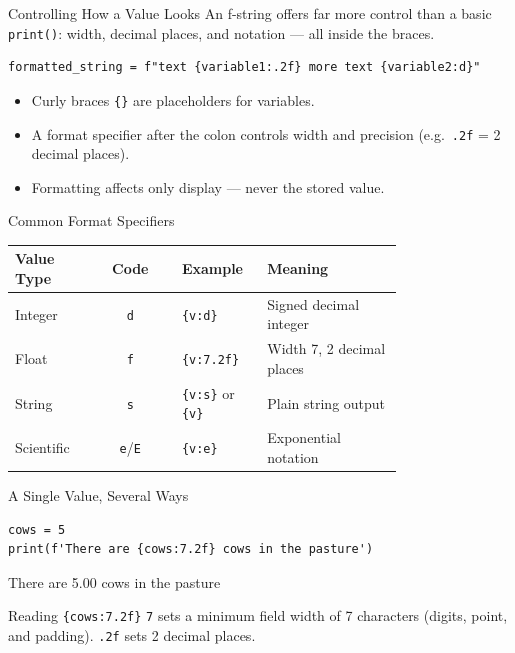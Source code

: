 \documentclass[9pt,aspectratio=169,xcolor=table]{beamer}
\newcommand{\striped}{\rowcolors{1}{white}{stripe}}
\begin{document}
\begin{frame}[fragile]{Controlling How a Value Looks}
    \leavevmode
    An f-string offers far more control than a basic \texttt{print()}:
    width, decimal places, and notation --- all inside the braces.

\begin{lstlisting}
formatted_string = f"text {variable1:.2f} more text {variable2:d}"
\end{lstlisting}

    \vspace{2mm}
    \begin{itemize}
        \item Curly braces \texttt{\{\}} are placeholders for variables.
        \item A \alert{format specifier} after the colon controls
              width and precision (e.g.\ \texttt{.2f} = 2 decimal
              places).
        \item Formatting affects only \alert{display} --- never the
              stored value.
    \end{itemize}
\end{frame}

\begin{frame}{Common Format Specifiers}
    \leavevmode
    \small
    \striped
    \begin{tabular}{@{}p{0.2\linewidth}cp{0.22\linewidth}p{0.35\linewidth}@{}}
        \toprule
        \textbf{Value Type} & \textbf{Code} & \textbf{Example} & \textbf{Meaning} \\
        \midrule
        Integer & \texttt{d} & \texttt{\{v:d\}} & Signed decimal integer \\
        Float & \texttt{f} & \texttt{\{v:7.2f\}} & Width 7, 2 decimal places \\
        String & \texttt{s} & \texttt{\{v:s\}} or \texttt{\{v\}} & Plain string output \\
        Scientific & \texttt{e}/\texttt{E} & \texttt{\{v:e\}} & Exponential notation \\
        \bottomrule
    \end{tabular}
\end{frame}

\begin{frame}[fragile]{A Single Value, Several Ways}
    \leavevmode
\begin{lstlisting}
cows = 5
print(f'There are {cows:7.2f} cows in the pasture')
\end{lstlisting}

\begin{pyout}
There are    5.00 cows in the pasture
\end{pyout}

    \vspace{2mm}
    \begin{block}{Reading \texttt{\{cows:7.2f\}}}
        \texttt{7} sets a minimum field width of 7 characters
        (digits, point, and padding). \texttt{.2f} sets 2 decimal
        places.
    \end{block}
\end{frame}
\end{document}
